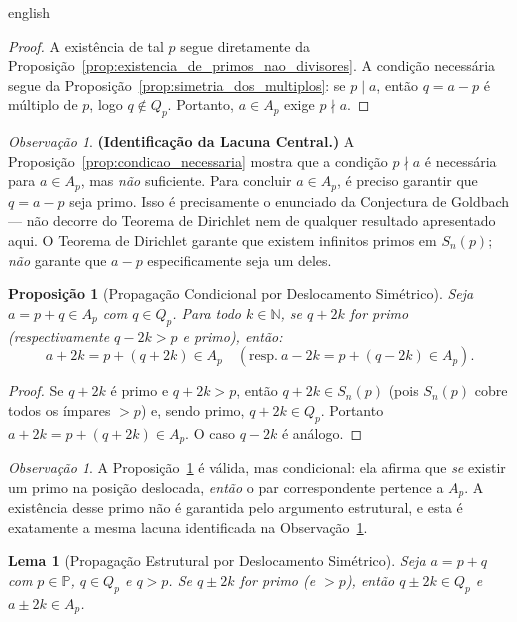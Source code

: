 \documentclass[a4paper,11pt]{article}
\newtheorem{lemma}[theorem]{Lema}
\newtheorem{proposition}[theorem]{Proposição}
\theoremstyle{definition}
\theoremstyle{remark}
\newtheorem{remark}[theorem]{Observação}
\begin{document}
\begin{otherlanguage*}{english}
		\begin{proof}
			A existência de tal $p$ segue diretamente da
			Proposição~\ref{prop:existencia_de_primos_nao_divisores}. A condição
			necessária segue da Proposição~\ref{prop:simetria_dos_multiplos}: se
			$p \mid a$, então $q = a - p$ é múltiplo de $p$, logo $q \notin Q_p$.
			Portanto, $a \in A_p$ exige $p \nmid a$.
		\end{proof}
		
		\begin{remark}\label{rem:lacuna}
			\textbf{(Identificação da Lacuna Central.)}
			A Proposição~\ref{prop:condicao_necessaria} mostra que a condição $p \nmid a$
			é necessária para $a \in A_p$, mas \emph{não} suficiente. Para concluir
			$a \in A_p$, é preciso garantir que $q = a - p$ seja primo. Isso é
			precisamente o enunciado da Conjectura de Goldbach — não decorre do Teorema
			de Dirichlet nem de qualquer resultado apresentado aqui. O Teorema de
			Dirichlet garante que existem infinitos primos em $S_n(p)$; \emph{não}
			garante que $a - p$ especificamente seja um deles.
		\end{remark}
		
		\begin{proposition}[Propagação Condicional por Deslocamento Simétrico]%
			\label{prop:propagacao}
			Seja $a = p + q \in A_p$ com $q \in Q_p$. Para todo $k \in \mathbb{N}$,
			se $q + 2k$ for primo (respectivamente $q - 2k > p$ e primo), então:
			\[
			a + 2k = p + (q + 2k) \in A_p \quad
			(\text{resp.}\ a - 2k = p + (q - 2k) \in A_p).
			\]
		\end{proposition}
		
		\begin{proof}
			Se $q + 2k$ é primo e $q + 2k > p$, então $q + 2k \in S_n(p)$ (pois
			$S_n(p)$ cobre todos os ímpares $> p$) e, sendo primo, $q + 2k \in Q_p$.
			Portanto $a + 2k = p + (q + 2k) \in A_p$. O caso $q - 2k$ é análogo.
		\end{proof}
		
		\begin{remark}
			A Proposição~\ref{prop:propagacao} é válida, mas condicional: ela afirma
			que \emph{se} existir um primo na posição deslocada, \emph{então} o par
			correspondente pertence a $A_p$. A existência desse primo não é garantida
			pelo argumento estrutural, e esta é exatamente a mesma lacuna identificada
			na Observação~\ref{rem:lacuna}.
		\end{remark}
		
		\begin{lemma}[Propagação Estrutural por Deslocamento Simétrico]
			Seja $a = p + q$ com $p \in \mathbb{P}$, $q \in Q_p$ e $q > p$. Se
			$q \pm 2k$ for primo (e $> p$), então $q \pm 2k \in Q_p$ e
			$a \pm 2k \in A_p$.
		\end{lemma}
		

\end{otherlanguage*}
\end{document}
